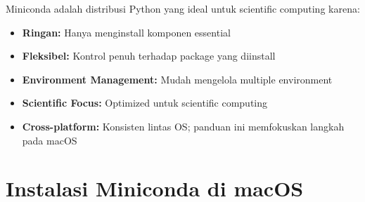 Miniconda adalah distribusi Python yang ideal untuk scientific computing karena:
\begin{itemize}
    \item \textbf{Ringan:} Hanya menginstall komponen essential
    \item \textbf{Fleksibel:} Kontrol penuh terhadap package yang diinstall
    \item \textbf{Environment Management:} Mudah mengelola multiple environment
    \item \textbf{Scientific Focus:} Optimized untuk scientific computing
    \item \textbf{Cross-platform:} Konsisten lintas OS; panduan ini memfokuskan langkah pada macOS
\end{itemize}

\section{Instalasi Miniconda di macOS}

